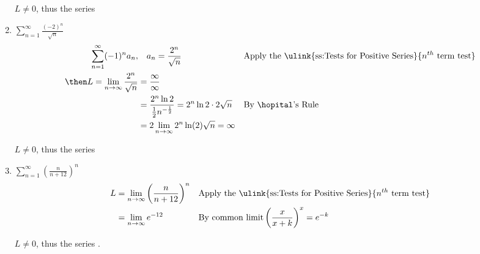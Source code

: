 \begin{enumerate}[itemsep=12em]
    \(L \neq 0\), thus the series 

\vspace{-64pt}
  \item \(\displaystyle \sum_{n=1}^{\infty} \frac{(-2)^n}{\sqrt{n} } \)
    \begin{align*}
      \sum_{n=1}^{\infty} (-1)^n a_n, &\quad a_n = \frac{2^n}{\sqrt{n}}
      && \text{Apply the \ulink{ss:Tests for Positive Series}{\(n^{th}\) term test}} \\
      \then L = \lim_{n \to \infty} \frac{2^n}{\sqrt{n} } &= \frac{\infty}{\infty} \\
      &= \frac{2^n \ln 2}{\frac{1}{2} n^{-\frac{1}{2}}} = 2^n \ln 2 \cdot 2 \sqrt{n}
      && \text{By \hopital's Rule} \\
      &= 2 \lim_{n \to \infty} 2^n \ln(2) \sqrt{n} = \infty
    \end{align*}

    \(L \neq 0\), thus the series 

  \item \(\displaystyle \sum_{n=1}^{\infty} \left( \frac{n}{n+12} \right)^n \)
    \begin{align*}
       L &= \lim_{n \to \infty} \left( \frac{n}{n+12} \right)^n
      && \text{Apply the \ulink{ss:Tests for Positive Series}{\(n^{th} \) term test}} \\
              &= \lim_{n \to \infty} e^{-12}
      && \text{By common limit} \left( \frac{x}{x+k} \right)^x = e^{-k}  \\
    \end{align*}

    \(L \neq 0\), thus the series .

\end{enumerate}

